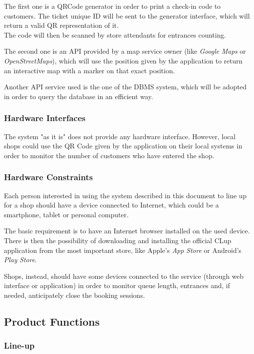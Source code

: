 \documentclass[table, 12pt]{article}
\begin{document}
The first one is a QRCode generator in order to print a check-in code to customers.
The ticket unique ID will be sent to the generator interface, which will return a valid QR representation of it.\\
The code will then be scanned by store attendants for entrances counting.

The second one is an API provided by a map service owner (like \textit{Google Maps} or \textit{OpenStreetMaps}), which will use the position given by the application to return an interactive map with a marker on that exact position.

Another API service used is the one of the DBMS system, which will be adopted in order to query the database in an efficient way.
\subsubsection{Hardware Interfaces}
The system "as it is" does not provide any hardware interface. However, local shops could use the QR Code given by the application on their local systems in order to monitor the number of customers who have entered the shop.
\subsubsection{Hardware Constraints}
Each person interested in using the system described in this document to line up for a shop should have a device connected to Internet, which could be a smartphone, tablet or personal computer.

The basic requirement is to have an Internet browser installed on the used device.
There is then the possibility of downloading and installing the official CLup application from the most important store, like Apple's \textit{App Store} or Android's \textit{Play Store}.

Shops, instead, should have some devices connected to the service (through web interface or application) in order to monitor queue length, entrances and, if needed, anticipately close the booking sessions.

\newpage
\subsection{Product Functions}
\label{product_functions}

\subsubsection{Line-up}
\end{document}
